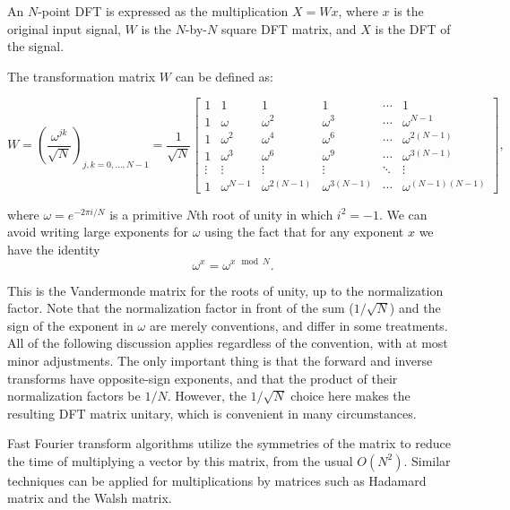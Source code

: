 \documentclass[twoside,onecolumn]{article}
\begin{document}
An $N$-point DFT is expressed as the multiplication $X=Wx$, 
where $x$ is the original input signal, $W$ is the $N$-by-$N$ 
square DFT matrix, and $X$ is the DFT of the signal.

The transformation matrix $W$ can be defined as:

\begin{equation}
    W = \left({\frac {\omega ^{jk}}{\sqrt {N}}}\right)_{j,k=0,\ldots ,N-1}= \frac{1}{\sqrt{N}}{
    \begin{bmatrix}
        1&1&1&1&\cdots &1\\
        1&\omega &\omega ^{2}&\omega ^{3}&\cdots &\omega ^{N-1}\\
        1&\omega ^{2}&\omega ^{4}&\omega ^{6}&\cdots &\omega ^{2(N-1)}
        \\1&\omega ^{3}&\omega ^{6}&\omega ^{9}&\cdots &\omega ^{3(N-1)}\\
        \vdots &\vdots &\vdots &\vdots &\ddots &\vdots \\
        1&\omega ^{N-1}&\omega ^{2(N-1)}&\omega ^{3(N-1)}&\cdots &\omega ^{(N-1)(N-1)}
    \end{bmatrix}},    
\end{equation}


where $\omega =e^{-2\pi i/N}$ is a primitive $N$th root of unity in which $i^{2}=-1$. 
We can avoid writing large exponents for $\omega$ using the fact that for any exponent $x$ 
we have the identity 
\begin{equation}
    \omega^{x}=\omega^{x\mod N}.    
\end{equation}

This is the Vandermonde matrix for the roots of unity, up to the normalization factor. 
Note that the normalization factor in front of the sum ($1/{\sqrt {N}}$) 
and the sign of the exponent in $\omega$ are merely conventions, and differ in some treatments. 
All of the following discussion applies regardless of the convention, with at most minor adjustments. 
The only important thing is that the forward and inverse transforms have opposite-sign exponents,
and that the product of their normalization factors be $1/N$. However, the $1/\sqrt{N}$ choice here 
makes the resulting DFT matrix unitary, which is convenient in many circumstances.

Fast Fourier transform algorithms utilize the symmetries of the matrix to reduce the time
of multiplying a vector by this matrix, from the usual $O(N^{2})$. Similar techniques can be applied
for multiplications by matrices such as Hadamard matrix and the Walsh matrix.
\end{document}
